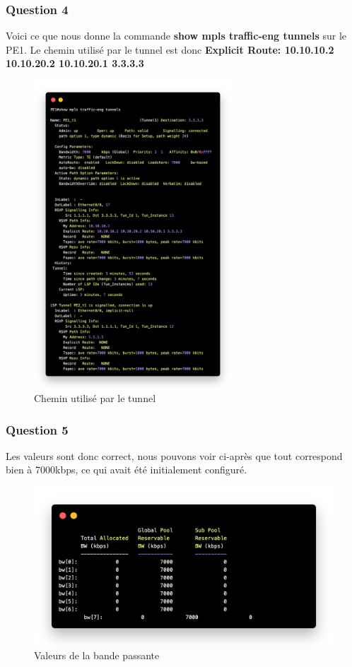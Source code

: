 \documentclass[12pt, a4paper]{article}
\begin{document}
\subsubsection{Question 4}
Voici ce que nous donne la commande \textbf{show mpls traffic-eng tunnels} sur le PE1.
Le chemin utilisé par le tunnel est donc \textbf{Explicit Route: 10.10.10.2 10.10.20.2 10.10.20.1 3.3.3.3}

\begin{figure}[h]
    \centering
    \includegraphics[width=0.66\textwidth]{img/code6.png}
    \caption{Chemin utilisé par le tunnel}
    \label{fig:script6}
\end{figure}

\newpage
\subsubsection{Question 5}
Les valeurs sont donc correct, nous pouvons voir ci-après que tout 
correspond bien  à 7000kbps, ce qui avait été initialement configuré.
\begin{figure}[h]
    \centering
    \includegraphics[width=1\textwidth]{img/code7.png}
    \caption{Valeurs de la bande passante}
    \label{fig:script7}
\end{figure}
\end{document}
